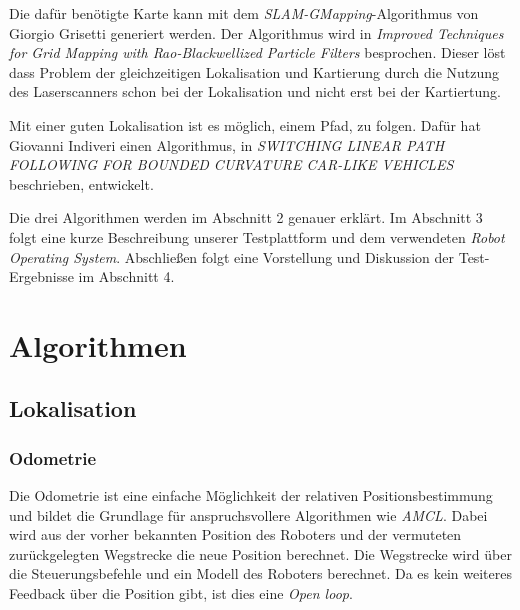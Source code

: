 \documentclass[11pt,a4paper]{article}
\begin{document}
	Die daf\"ur ben\"otigte Karte kann mit dem \textit{SLAM-GMapping}-Algorithmus von Giorgio Grisetti generiert werden. Der Algorithmus wird in \textit{Improved Techniques for Grid Mapping
	with Rao-Blackwellized Particle Filters} \cite{Gmapping} besprochen. Dieser l\"ost dass Problem der gleichzeitigen Lokalisation und Kartierung durch die Nutzung des Laserscanners schon bei der Lokalisation und nicht erst bei der Kartiertung. 
	
	Mit einer guten Lokalisation ist es m\"oglich, einem Pfad, zu folgen. Daf\"ur hat Giovanni Indiveri einen Algorithmus, in \textit{SWITCHING
	LINEAR PATH FOLLOWING FOR
	BOUNDED CURVATURE CAR-LIKE
	VEHICLES} \cite{Giovanni} beschrieben, entwickelt. 

	Die drei Algorithmen werden im Abschnitt 2 genauer erkl\"art. Im Abschnitt 3 folgt eine kurze Beschreibung unserer Testplattform und dem verwendeten \textit{Robot Operating System}. Abschlie{\ss}en folgt eine Vorstellung und Diskussion der Test-Ergebnisse im Abschnitt 4.
  

\section{Algorithmen}

\subsection{Lokalisation}
\subsubsection{Odometrie}
{
	Die Odometrie ist eine einfache M\"oglichkeit der relativen Positionsbestimmung und bildet die Grundlage f\"ur anspruchsvollere Algorithmen wie \textit{AMCL}. Dabei wird aus der vorher bekannten Position des Roboters und der vermuteten zur\"uckgelegten Wegstrecke die neue Position berechnet. Die Wegstrecke wird \"uber die Steuerungsbefehle und ein Modell des Roboters berechnet. Da es kein weiteres Feedback \"uber die Position gibt, ist dies eine \textit{Open loop}. 
}
\end{document}
